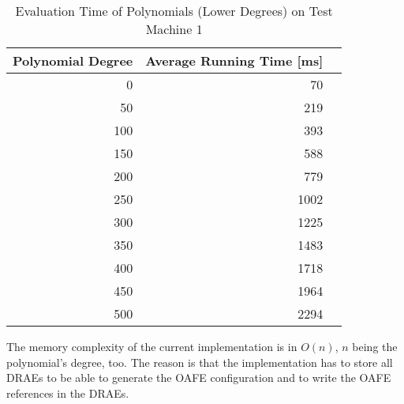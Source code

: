 \begin{table}[ht]
  \centering
  \begin{tabular}{rrr}
    \toprule
    Polynomial Degree & Average Running Time [ms] \\
    \midrule
    0 &   70 \\
    50 &  219 \\
    100 &  393 \\
    150 &  588 \\
    200 &  779 \\
    250 & 1002 \\
    300 & 1225 \\
    350 & 1483 \\
    400 & 1718 \\
    450 & 1964 \\
    500 & 2294 \\
    \bottomrule
  \end{tabular}
  \caption{Evaluation Time of Polynomials (Lower Degrees) on Test Machine 1}
  \label{tab:poly-deg-t-small}
\end{table}


%
%
\label{sec:mem-complexity}

The memory complexity of the current implementation is in $O(n)$, $n$ being the
polynomial's degree, too. The reason is that the implementation has to store all
DRAEs to be able to generate the OAFE configuration and to write the OAFE
references in the DRAEs.

